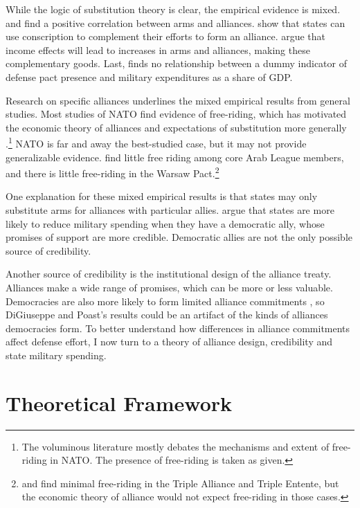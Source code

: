 \documentclass[12pt]{article}
\begin{document}
While the logic of substitution theory is clear, the empirical evidence is mixed. \citet{Diehl1994} and \citet{QuirozFlores2011} find a positive correlation between arms and alliances. \citet{Horowitzetal2017} show that states can use conscription to complement their efforts to form an alliance. \citet{MorganPalmer2006} argue that income effects will lead to increases in arms and alliances, making these complementary goods. Last, \citet{Goldsmith2003} finds no relationship between a dummy indicator of defense pact presence and military expenditures as a share of GDP. 

Research on specific alliances underlines the mixed empirical results from general studies. Most studies of NATO find evidence of free-riding, which has motivated the economic theory of alliances and expectations of substitution more generally \citep{OlsonZeckhauser1966, SandlerForbes1980, Palmer1990, PluemperNeumayer2015, GeorgeSandler2017}.\footnote{The voluminous literature mostly debates the mechanisms and extent of free-riding in NATO. The presence of free-riding is taken as given.} NATO is far and away the best-studied case, but it may not provide generalizable evidence. \citet{Chenetal1996} find little free riding among core Arab League members, and there is little free-riding in the Warsaw Pact.\footnote{\citet{ConybeareSandler1990} and \citet{Goldstein1995}  find minimal free-riding in the Triple Alliance and Triple Entente, but the economic theory of alliance would not expect free-riding in those cases.}  

One explanation for these mixed empirical results is that states may only substitute arms for alliances with particular allies. \citet{DigiuseppePoast2016} argue that states are more likely to reduce military spending when they have a democratic ally, whose promises of support are more credible. Democratic allies are not the only possible source of credibility. 

Another source of credibility is the institutional design of the alliance treaty. Alliances make a wide range of promises, which can be more or less valuable. Democracies are also more likely to form limited alliance commitments \citep{Chibaetal2015}, so DiGiuseppe and Poast's results could be an artifact of the kinds of alliances democracies form. To better understand how differences in alliance commitments affect defense effort, I now turn to a theory of alliance design, credibility and state military spending. 

\section*{Theoretical Framework} 
\end{document}

